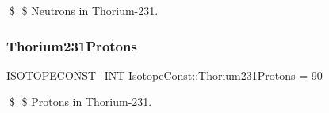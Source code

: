 \$ \$ Neutrons in Thorium-\/231. \mbox{\label{group___isotope_const-_thorium-_th231_ga24f8ac770b5190103d35a646d0631648}} 
\subsubsection{\texorpdfstring{Thorium231\+Protons}{Thorium231Protons}}
{\footnotesize\ttfamily \mbox{\hyperlink{group___isotope_const-_macros_ga5f18360b3e99483a35c32d789e62621c}{I\+S\+O\+T\+O\+P\+E\+C\+O\+N\+S\+T\+\_\+\+I\+NT}} Isotope\+Const\+::\+Thorium231\+Protons = 90}

\$ \$ Protons in Thorium-\/231. 